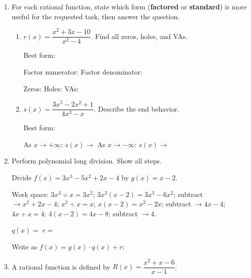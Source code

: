 \documentclass[10pt]{article}
\begin{document}
\namedateperiod

\vspace{0.12in}

\begin{enumerate}[itemsep=18pt]

\item For each rational function, state which form (\textbf{factored} or \textbf{standard}) is
      more useful for the requested task, then answer the question.

      \begin{enumerate}[label=(\alph*), itemsep=10pt]
        \item $r(x) = \dfrac{x^2+3x-10}{x^2-4}$. \quad Find all zeros, holes, and VAs.

              \vspace{0.06in}
              Best form: 

              Factor numerator:  \quad Factor denominator: 

              Zeros:  \quad Holes:  \quad VAs: 

        \item $s(x) = \dfrac{3x^5 - 2x^2 + 1}{4x^3 - x}$. \quad Describe the end behavior.

              \vspace{0.06in}
              Best form: 

              As $x \to +\infty$: $s(x) \to$ \ans{$+\infty$} \quad As $x \to -\infty$: $s(x) \to$ \ans{$+\infty$}
      \end{enumerate}

\item Perform polynomial long division. Show all steps.

      Divide $f(x) = 3x^3 - 5x^2 + 2x - 4$ by $g(x) = x - 2$.

      \vspace{0.1in}
      Work space: $3x^3\div x = 3x^2$; $3x^2(x-2)=3x^3-6x^2$; subtract $\to x^2+2x-4$;
      $x^2\div x = x$; $x(x-2)=x^2-2x$; subtract $\to 4x-4$;
      $4x\div x = 4$; $4(x-2)=4x-8$; subtract $\to 4$.

      $q(x) = $  \quad $r = $ 

      Write as $f(x) = g(x)\cdot q(x) + r$: 

\item A rational function is defined by $\displaystyle R(x) = \dfrac{x^2 + x - 6}{x - 1}$.


\end{enumerate}
\end{document}
